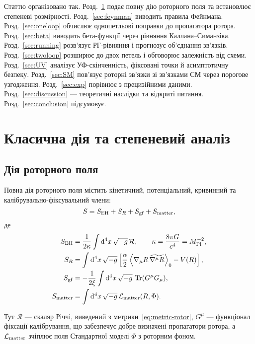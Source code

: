 \documentclass[11pt,a4paper]{article}
\numberwithin{equation}{section}
\theoremstyle{plain}
\theoremstyle{definition}
\theoremstyle{remark}
\DeclareMathOperator{\Tr}{Tr}
\newcommand{\dd}{\mathrm{d}}
\newcommand{\rev}[1]{\widetilde{#1}}        %
\newcommand{\grade}[2]{\left\langle #1 \right\rangle_{#2}}
\newcommand{\Lag}{\mathcal{L}}              %
\begin{document}
Статтю організовано так. Розд.~\ref{sec:action} подає повну дію роторного поля та встановлює степеневі розмірності. Розд.~\ref{sec:feynman} виводить правила Фейнмана. Розд.~\ref{sec:oneloop} обчислює однопетльові поправки до пропагатора ротора. Розд.~\ref{sec:beta} виводить бета-функції через рівняння Каллана–Симанзіка. Розд.~\ref{sec:running} розв’язує РГ-рівняння і прогнозує об’єднання зв’язків. Розд.~\ref{sec:twoloop} розширює до двох петель і обговорює залежність від схеми. Розд.~\ref{sec:UV} аналізує УФ-скінченність, фіксовані точки й асимптотичну безпеку. Розд.~\ref{sec:SM} пов’язує роторні зв’язки зі зв’язками СМ через порогове узгодження. Розд.~\ref{sec:exp} порівнює з прецизійними даними. Розд.~\ref{sec:discussion} — теоретичні наслідки та відкриті питання. Розд.~\ref{sec:conclusion} підсумовує.

\vspace{1em}

\section{Класична дія та степеневий аналіз}\label{sec:action}

\subsection{Дія роторного поля}

Повна дія роторного поля містить кінетичний, потенціальний, кривинний та калібрувально-фіксувальний члени:
\begin{equation}
S = S_{\rm EH} + S_R + S_{\rm gf} + S_{\rm matter},
\label{eq:action-total}
\end{equation}
де
\begin{align}
S_{\rm EH} &= \frac{1}{2\kappa}\int \dd^4x\,\sqrt{-g}\,\mathcal{R}, \qquad \kappa=\frac{8\pi G}{c^4}=M_{\rm Pl}^{-2}, \label{eq:S-EH}\\
S_R &= \int \dd^4x\,\sqrt{-g}\left[\frac{\alpha}{2}\grade{\nabla_\mu R\,\rev{\nabla^\mu R}}{0} - V(R)\right], \label{eq:S-rotor}\\
S_{\rm gf} &= -\frac{1}{2\xi}\int \dd^4x\,\sqrt{-g}\,\Tr(G^\mu G_\mu), \label{eq:S-gf}\\
S_{\rm matter} &= \int \dd^4x\,\sqrt{-g}\,\Lag_{\rm matter}(R,\Phi). \label{eq:S-matter}
\end{align}

Тут $\mathcal{R}$ — скаляр Річчі, виведений з метрики~\eqref{eq:metric-rotor}, $G^\mu$ — функціонал фіксації калібрування, що забезпечує добре визначені пропагатори ротора, а $\Lag_{\rm matter}$ зчіплює поля Стандартної моделі $\Phi$ з роторним фоном.
\end{document}
